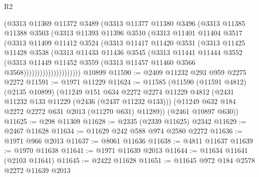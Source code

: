 \begin{lexlean}{R2}
\begin{coremodule}
                      (@3313
                        @11369
                        @11372
                        @3489
                        (@3313
                          @11377
                          @11380
                          @3496
                          (@3313
                            @11385
                            @11388
                            @3503
                            (@3313
                              @11393
                              @11396
                              @3510
                              (@3313
                                @11401
                                @11404
                                @3517
                                (@3313
                                  @11409
                                  @11412
                                  @3524
                                  (@3313
                                    @11417
                                    @11420
                                    @3531
                                    (@3313
                                      @11425
                                      @11428
                                      @3538
                                      (@3313
                                        @11433
                                        @11436
                                        @3545
                                        (@3313
                                          @11441
                                          @11444
                                          @3552
                                          (@3313
                                            @11449
                                            @11452
                                            @3559
                                            (@3313 @11457 @11460 @3566 @3568)))))))))))))))))))))
    @10899
@11590 := @2409 @11232 @293 @959 @2275 @2272
@11591 := @1971 @11229
@11624 := @11585
    (@11590
      (@11591 @4812)
      (@2135 @10899)
      (@11249
        @151
        @634
        @2272
        @2274
        @11229
        @4812
        (@2431 @11232 @133 @11229 (@2436 (@2437 @11232 @133)))
        (@11249 @632 @184 @2272 @2272 @631 @2013 (@11270 @631) @11289))
      (@2461 @10897 @630))
@11625 := @298 @11309
@11628 := @2335 (@2339 @11625) @2342
@11629 := @2467 @11628
@11634 := @11629 @242 @588 @974 @2580 @2272
@11636 := @1971 @966 @2013
@11637 := @8061 @11636
@11638 := @4811 @11637
@11639 := @1970 @11638
@11641 := @1971 @11639 @2013
@11644 := @11634 @11641 (@2103 @11641)
@11645 := @2422 @11628
@11651 := @11645 @972 @184 @2578 @2272 @11639 @2013

\end{coremodule}
\end{lexlean}
